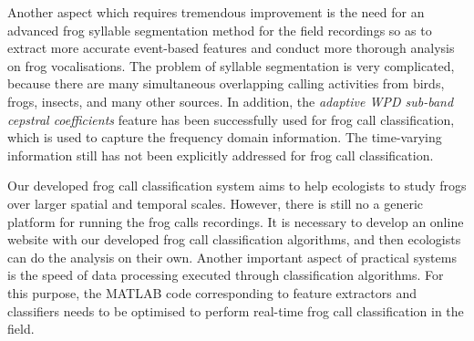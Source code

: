 Another aspect which requires tremendous improvement is the need for an advanced frog syllable segmentation method for the field recordings so as to extract more accurate event-based features and conduct more thorough analysis on frog vocalisations. The problem of syllable segmentation is very complicated, because there are many simultaneous overlapping calling activities from birds, frogs, insects, and many other sources. In addition, the \textit{adaptive WPD sub-band cepstral coefficients} feature has been successfully used for frog call classification, which is used to capture the frequency domain information. The time-varying information still has not been explicitly addressed for frog call classification. 

Our developed frog call classification system aims to help ecologists to study frogs over larger spatial and temporal scales. However, there is still no a generic platform for running the frog calls recordings. It is necessary to develop an online website with our developed frog call classification algorithms, and then ecologists can do the analysis on their own. Another important aspect of practical systems is the speed of data processing executed through classification algorithms. For this purpose, the MATLAB code corresponding to feature extractors and classifiers needs to be optimised to perform real-time frog call classification in the field.



